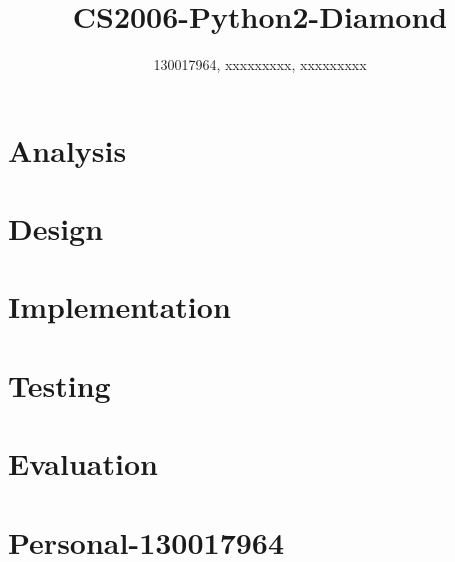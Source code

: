 \documentclass{article}
\title{CS2006-Python2-Diamond}
\author{130017964, xxxxxxxxx, xxxxxxxxx}
\begin{document}
\maketitle

\section{Analysis}
\section{Design}
\section{Implementation}
\section{Testing}
\section{Evaluation}
\section{Personal-130017964}
\end{document}
